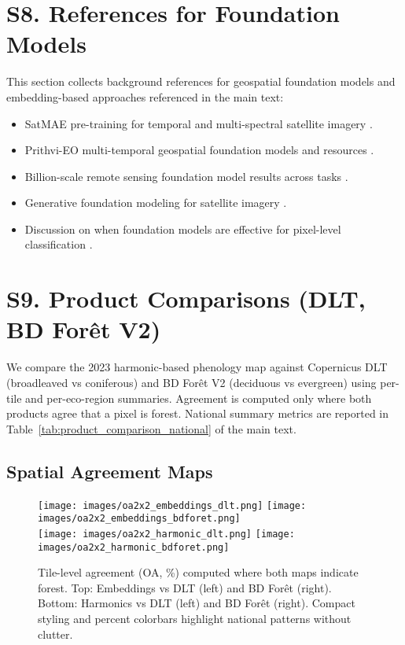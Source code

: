 \documentclass[utf8]{frontiers_suppmat}
\begin{document}
\section{S8. References for Foundation Models}

This section collects background references for geospatial foundation models and embedding-based approaches referenced in the main text:

\begin{itemize}
    \item SatMAE pre-training for temporal and multi-spectral satellite imagery \citep{Cong2022}.
    \item Prithvi-EO multi-temporal geospatial foundation models and resources \citep{Szwarcman2024PrithviEO2}.
    \item Billion-scale remote sensing foundation model results across tasks \citep{Cha2023Billion}.
    \item Generative foundation modeling for satellite imagery \citep{Khanna2023DiffusionSat}.
    \item Discussion on when foundation models are effective for pixel-level classification \citep{Xie2024FoundationEffective}.
\end{itemize}

\section{S9. Product Comparisons (DLT, BD For\^et V2)}

We compare the 2023 harmonic-based phenology map against Copernicus DLT (broadleaved vs coniferous) and BD For\^et V2 (deciduous vs evergreen) using per-tile and per-eco-region summaries. Agreement is computed only where both products agree that a pixel is forest. National summary metrics are reported in Table~\ref{tab:product_comparison_national} of the main text.

\subsection{Spatial Agreement Maps}

\begin{figure}[H]
    \centering
    \texttt{[image: images/oa2x2\_embeddings\_dlt.png]}\hfill
    \texttt{[image: images/oa2x2\_embeddings\_bdforet.png]}\\[0.5em]
    \texttt{[image: images/oa2x2\_harmonic\_dlt.png]}\hfill
    \texttt{[image: images/oa2x2\_harmonic\_bdforet.png]}
    \caption{Tile-level agreement (OA, \%) computed where both maps indicate forest. Top: Embeddings vs DLT (left) and BD For\^et (right). Bottom: Harmonics vs DLT (left) and BD For\^et (right). Compact styling and percent colorbars highlight national patterns without clutter.}
    \label{fig:oa2x2_products}
\end{figure}
\end{document}
